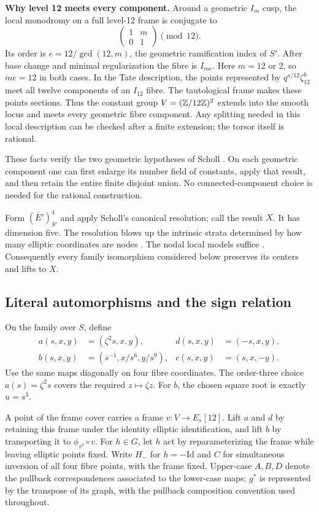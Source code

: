 \textbf{Why level 12 meets every component.} Around a geometric $I_m$ cusp,
the local monodromy on a full level-12 frame is conjugate to
\[
\begin{pmatrix}1&m\\0&1\end{pmatrix}\pmod {12}.
\]
Its order is $e=12/\gcd(12,m)$, the geometric ramification index of $S'$.
After base change and minimal regularization the fibre is $I_{me}$.
Here $m=12$ or $2$, so $me=12$ in both cases. In the Tate description,
the points represented by $q^{a/12}\zeta_{12}^b$ meet all twelve components
of an $I_{12}$ fibre. The tautological frame makes these points sections.
Thus the constant group $V=(\mathbb Z/12\mathbb Z)^2$ extends into the smooth locus and
meets every geometric fibre component. Any splitting needed in this local
description can be checked after a finite extension; the torsor itself is rational.

These facts verify the two geometric hypotheses of Scholl \cite[Section~2.2]{SchollVanishing}.
On each geometric component one can first enlarge its number field of
constants, apply that result, and then retain the entire finite disjoint union.
No connected-component choice is needed for the rational construction.

Form $(\overline E')^4_{\overline S'}$ and apply Scholl's canonical resolution;
call the result $X$. It has dimension five. The resolution blows up the
intrinsic strata determined by how many elliptic coordinates are nodes
\cite[Section~3.0]{SchollMotives}. The nodal local models suffice \cite[Section~2.10]{SchollVanishing}. Consequently every
family isomorphism considered below preserves its centers and lifts to $X$.


\subsection{Literal automorphisms and the sign relation}
On the family over $S$, define
\[
\begin{aligned}
a(s,x,y)&=(\zeta^2s,x,y),& d(s,x,y)&=(-s,x,y),\\
b(s,x,y)&=(s^{-1},x/s^6,y/s^9),& c(s,x,y)&=(s,x,-y).
\end{aligned}
\]
Use the same maps diagonally on four fibre coordinates. The order-three
choice $a(s)=\zeta^2s$ covers the required $z\mapsto\zeta z$.
For $b$, the chosen square root is exactly $u=s^3$.

A point of the frame cover carries a frame $v:V\to E_s[12]$. Lift $a$ and
$d$ by retaining this frame under the identity elliptic identification, and
lift $b$ by transporting it to $\phi_{s^3}\circ v$. For $h\in G$, let $h$
act by reparameterizing the frame while leaving elliptic points fixed.
Write $H_-$ for $h=-\mathrm{Id}$ and $C$ for simultaneous inversion of all
four fibre points, with the frame fixed. Upper-case $A,B,D$ denote the
pullback correspondences associated to the lower-case maps; $g^*$ is
represented by the transpose of its graph, with the pullback composition
convention used throughout.

